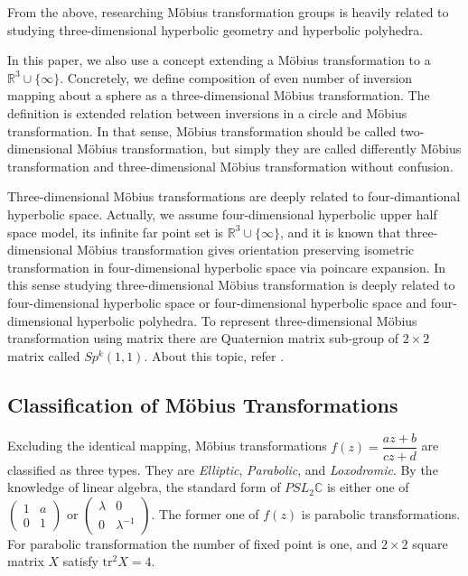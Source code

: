 From the above, researching M\"obius transformation groups is heavily
related to studying three-dimensional hyperbolic geometry and hyperbolic
polyhedra.

In this paper, we also use a concept extending a M\"obius
transformation to a $\mathbb{R}^3\cup\{\infty\}$.
Concretely, we define composition of even number of inversion mapping
about a sphere as a three-dimensional M\"obius transformation.
The definition is extended relation between inversions in a circle and
M\"obius transformation.
In that sense, M\"obius transformation should be called two-dimensional
M\"obius transformation, but
simply they are called differently M\"obius transformation and
three-dimensional M\"obius transformation without confusion.

Three-dimensional M\"obius transformations are deeply related to
four-dimantional hyperbolic space. Actually, we assume four-dimensional
hyperbolic upper half space model, its infinite far point set is
$\mathbb{R}^3\cup\{\infty\}$, and it is known that three-dimensional M\"obius
transformation gives orientation preserving isometric transformation in
four-dimensional hyperbolic space via poincare expansion.
In this sense studying three-dimensional M\"obius transformation is
deeply related to four-dimensional hyperbolic space or four-dimensional
hyperbolic space and four-dimensional hyperbolic polyhedra.
To represent three-dimensional M\"obius transformation using matrix
there are Quaternion matrix sub-group of $2 \times 2$ matrix called
$Sp^k(1,1)$. About this topic, refer
\cite{sakugawa2010limit}\cite{sakugawa2007master}.


\subsection{Classification of M\"obius Transformations}

Excluding the identical mapping, M\"obius transformations
$f(z) = \dfrac{az + b}{cz + d}$ are classified as three types.
They are \textit{Elliptic}, \textit{Parabolic}, and \textit{Loxodromic}.
By the knowledge of linear algebra, the standard form of $PSL_2\mathbb{C}$
is either one of $\begin{pmatrix}1 & a \\ 0 & 1 \end{pmatrix}$ or
$\begin{pmatrix}\lambda & 0 \\ 0 & \lambda^{-1} \end{pmatrix}$.
The former one of $f(z)$ is parabolic transformations.
For parabolic transformation the number of fixed point is one, and
$2 \times 2$ square matrix $X$ satisfy $\mathrm{tr}^2X = 4$.

